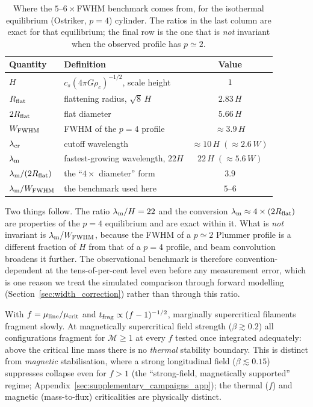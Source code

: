 \documentclass[usenatbib,twoside,twocolumn]{mnras}
\begin{document}
\begin{table}
\caption{Where the $5$--$6\times$FWHM benchmark comes from, for the isothermal equilibrium (Ostriker, $p=4$) cylinder. The ratios in the last column are exact for that equilibrium; the final row is the one that is \emph{not} invariant when the observed profile has $p\simeq2$.}
\label{tab:benchmark}
\footnotesize
\setlength{\tabcolsep}{4pt}
\begin{tabular}{llc}
\toprule
Quantity & Definition & Value \\
\midrule
$H$ & $c_s(4\pi G\rho_c)^{-1/2}$, scale height & $1$ \\
$R_{\rm flat}$ & flattening radius, $\sqrt{8}\,H$ & $2.83\,H$ \\
$2R_{\rm flat}$ & flat diameter & $5.66\,H$ \\
$W_{\rm FWHM}$ & FWHM of the $p=4$ profile & $\approx3.9\,H$ \\
$\lambda_{\rm cr}$ & cutoff wavelength & $\approx10\,H\;(\approx2.6\,W)$ \\
$\lambda_{\rm m}$ & fastest-growing wavelength, $22H$ & $22\,H\;(\approx5.6\,W)$ \\
\midrule
$\lambda_{\rm m}/(2R_{\rm flat})$ & the ``$4\times$ diameter'' form & $3.9$ \\
$\lambda_{\rm m}/W_{\rm FWHM}$ & the benchmark used here & $5$--$6$ \\
\bottomrule
\end{tabular}
\end{table}

Two things follow. The ratio $\lambda_{\rm m}/H=22$ and the conversion $\lambda_{\rm m}\approx4\times(2R_{\rm flat})$ are properties of the $p=4$ equilibrium and are exact within it. What is \emph{not} invariant is $\lambda_{\rm m}/W_{\rm FWHM}$, because the FWHM of a $p\simeq2$ Plummer profile is a different fraction of $H$ from that of a $p=4$ profile, and beam convolution broadens it further. The observational benchmark is therefore convention-dependent at the tens-of-per-cent level even before any measurement error, which is one reason we treat the simulated comparison through forward modelling (Section~\ref{sec:width_correction}) rather than through this ratio.

With $f=\mu_{\rm line}/\mu_{\rm crit}$ and $t_{\rm frag}\propto(f-1)^{-1/2}$, marginally supercritical filaments fragment slowly. At magnetically supercritical field strength ($\beta\gtrsim0.2$) all configurations fragment for $\mathcal{M}\geq1$ at every $f$ tested once integrated adequately: above the critical line mass there is no \emph{thermal} stability boundary. This is distinct from \emph{magnetic} stabilisation, where a strong longitudinal field ($\beta\lesssim0.15$) suppresses collapse even for $f>1$ (the ``strong-field, magnetically supported'' regime; Appendix~\ref{sec:supplementary_campaigns_app}); the thermal ($f$) and magnetic (mass-to-flux) criticalities are physically distinct.
\end{document}
